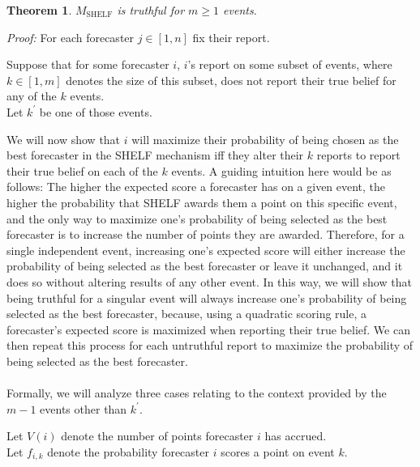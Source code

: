 \documentclass[letterpaper,12pt]{article}
\newcommand{\1}{\mathbbm{1}}
\newcommand{\shelf}{M_{\mathrm{SHELF}}}
\newtheorem{theorem}{Theorem}
\begin{document}
\begin{theorem}
  \label{shelf_truthful}
    $\shelf$ is truthful for $m \geq 1$ events.
\end{theorem}
\emph{Proof:} For each forecaster $j \in [1, n]$ fix their report.

Suppose that for some forecaster $i$, $i$'s report on some subset of events, where $k \in [1, m]$ denotes the size of this subset, does not report their true belief for any of the $k$ events.\\
Let $k^\prime$ be one of those events.

We will now show that $i$ will maximize their probability of being chosen as the best forecaster in the SHELF mechanism iff they alter their $k$ reports to report their true belief on each of the $k$ events. A guiding intuition here would be as follows: The higher the expected score a forecaster has on a given event, the higher the probability that SHELF awards them a point on this specific event, and the only way to maximize one's probability of being selected as the best forecaster is to increase the number of points they are awarded. Therefore, for a single independent event, increasing one's expected score will either increase the probability of being selected as the best forecaster or leave it unchanged, and it does so without altering results of any other event. In this way, we will show that being truthful for a singular event will always increase one's probability of being selected as the best forecaster, because, using a quadratic scoring rule, a forecaster's expected score is maximized when reporting their true belief. We can then repeat this process for each untruthful report to maximize the probability of being selected as the best forecaster.\\\\
Formally, we will analyze three cases relating to the context provided by the $m - 1$ events other than $k^\prime$.

Let $V(i)$ denote the number of points forecaster $i$ has accrued.\\
Let $f_{i,k}$ denote the probability forecaster $i$ scores a point on event $k$.\\
\end{document}
